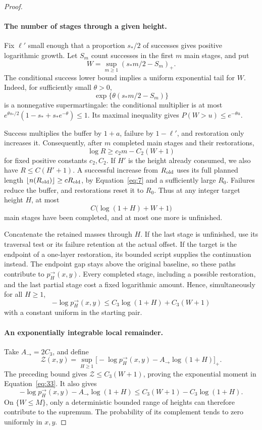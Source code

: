 \begin{proof}
\paragraph{The number of stages through a given height.}
Fix \(\ell'\) small enough that a proportion \(s_*/2\) of
successes gives positive logarithmic growth. Let \(S_m\) count
successes in the first \(m\) main stages, and put
\[
W=\sup_{m\ge1}(s_*m/2-S_m)_+.
\]
The conditional success lower bound implies a uniform exponential tail
for \(W\). Indeed, for sufficiently small \(\theta>0\),
\[
\exp\{\theta(s_*m/2-S_m)\}
\]
is a nonnegative supermartingale: the conditional multiplier is at most
\(e^{\theta s_*/2}(1-s_*+s_*e^{-\theta})\le1\).
Its maximal inequality gives \(P(W>u)\le e^{-\theta u}\).

Success multiplies the buffer by \(1+a\), failure by \(1-\ell'\),
and restoration only increases it. Consequently, after \(m\)
completed main stages and their restorations,
\[
\log R\ge c_2m-C_2(W+1)
\]
for fixed positive constants \(c_2,C_2\). If \(H'\) is the
height already consumed, we also have \(R\le C(H'+1)\).
A successful increase from \(R_{\rm old}\) uses its full planned
length \(\lfloor n(R_{\rm old})\rfloor\ge cR_{\rm old}\), by
Equation~\eqref{eq:7} and a sufficiently large \(R_0\). Failures
reduce the buffer, and restorations reset it to \(R_0\).
Thus at any integer target height \(H\), at most
\[
C\bigl(\log(1+H)+W+1\bigr)
\]
main stages have been completed, and at most one more is unfinished.

Concatenate the retained masses through \(H\). If the last stage is
unfinished, use its traversal test or its failure retention at the
actual offset. If the target is the endpoint of a one-layer restoration,
its bounded script supplies the continuation instead. The endpoint gap
stays above the original baseline, so
these paths contribute to \(p_H^\to(x,y)\). Every completed stage,
including a possible restoration, and the last partial stage cost a
fixed logarithmic amount. Hence, simultaneously for all \(H\ge1\),
\[
-\log p_H^\to(x,y)
\le C_3\log(1+H)+C_3(W+1)
\]
with a constant uniform in the starting pair.

\paragraph{An exponentially integrable local remainder.}
Take \(A_\to=2C_3\), and define
\[
\mathcal Z(x,y)=\sup_{H\ge1}
\bigl[-\log p_H^\to(x,y)-A_\to\log(1+H)\bigr]_+.
\]
The preceding bound gives \(\mathcal Z\le C_3(W+1)\), proving
the exponential moment in Equation~\eqref{eq:33}. It also gives
\[
-\log p_H^\to(x,y)-A_\to\log(1+H)
\le C_3(W+1)-C_3\log(1+H).
\]
On \(\{W\le M\}\), only a deterministic bounded range of heights
can therefore contribute to the supremum. The probability of its
complement tends to zero uniformly in \(x,y\).


\end{proof}
